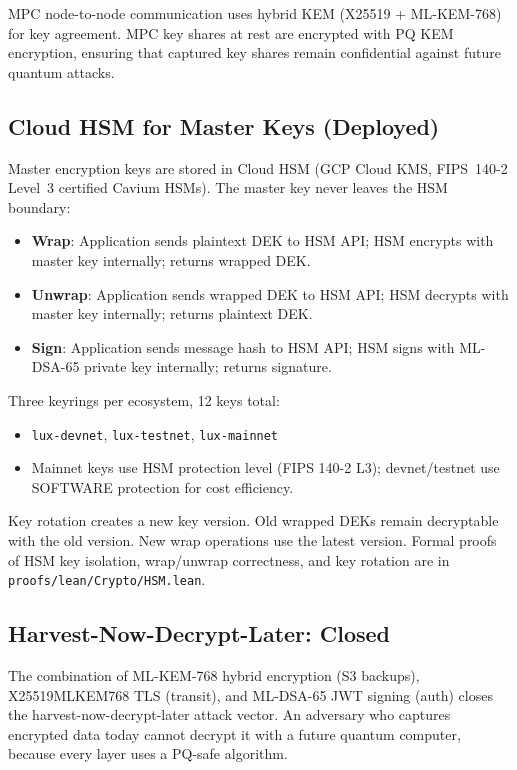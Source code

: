 MPC node-to-node communication uses hybrid KEM (X25519 + ML-KEM-768)
for key agreement. MPC key shares at rest are encrypted with PQ KEM
encryption, ensuring that captured key shares remain confidential
against future quantum attacks.

\subsection{Cloud HSM for Master Keys (Deployed)}

Master encryption keys are stored in Cloud HSM (GCP Cloud KMS,
FIPS~140-2 Level~3 certified Cavium HSMs). The master key never
leaves the HSM boundary:

\begin{itemize}[nosep]
  \item \textbf{Wrap}: Application sends plaintext DEK to HSM API;
    HSM encrypts with master key internally; returns wrapped DEK.
  \item \textbf{Unwrap}: Application sends wrapped DEK to HSM API;
    HSM decrypts with master key internally; returns plaintext DEK.
  \item \textbf{Sign}: Application sends message hash to HSM API;
    HSM signs with ML-DSA-65 private key internally; returns signature.
\end{itemize}

Three keyrings per ecosystem, 12 keys total:
\begin{itemize}[nosep]
  \item \texttt{lux-devnet}, \texttt{lux-testnet}, \texttt{lux-mainnet}
  \item Mainnet keys use HSM protection level (FIPS 140-2 L3);
    devnet/testnet use SOFTWARE protection for cost efficiency.
\end{itemize}

Key rotation creates a new key version. Old wrapped DEKs remain
decryptable with the old version. New wrap operations use the latest
version. Formal proofs of HSM key isolation, wrap/unwrap correctness,
and key rotation are in \texttt{proofs/lean/Crypto/HSM.lean}.

\subsection{Harvest-Now-Decrypt-Later: Closed}

The combination of ML-KEM-768 hybrid encryption (S3 backups),
X25519MLKEM768 TLS (transit), and ML-DSA-65 JWT signing (auth)
closes the harvest-now-decrypt-later attack vector. An adversary
who captures encrypted data today cannot decrypt it with a future
quantum computer, because every layer uses a PQ-safe algorithm.

